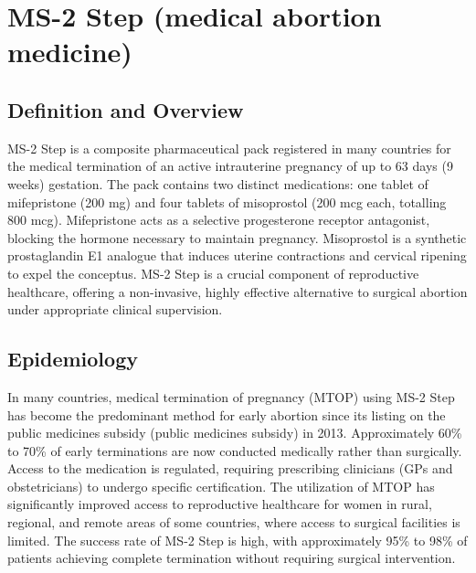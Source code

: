 \chapter{MS-2 Step (medical abortion medicine)}

\section*{Definition and Overview}
MS-2 Step is a composite pharmaceutical pack registered in many countries for the medical termination of an active intrauterine pregnancy of up to 63 days (9 weeks) gestation. The pack contains two distinct medications: one tablet of mifepristone (200 mg) and four tablets of misoprostol (200 mcg each, totalling 800 mcg). Mifepristone acts as a selective progesterone receptor antagonist, blocking the hormone necessary to maintain pregnancy. Misoprostol is a synthetic prostaglandin E1 analogue that induces uterine contractions and cervical ripening to expel the conceptus. MS-2 Step is a crucial component of reproductive healthcare, offering a non-invasive, highly effective alternative to surgical abortion under appropriate clinical supervision.

\section*{Epidemiology}
In many countries, medical termination of pregnancy (MTOP) using MS-2 Step has become the predominant method for early abortion since its listing on the public medicines subsidy (public medicines subsidy) in 2013. Approximately 60\% to 70\% of early terminations are now conducted medically rather than surgically. Access to the medication is regulated, requiring prescribing clinicians (GPs and obstetricians) to undergo specific certification. The utilization of MTOP has significantly improved access to reproductive healthcare for women in rural, regional, and remote areas of some countries, where access to surgical facilities is limited. The success rate of MS-2 Step is high, with approximately 95\% to 98\% of patients achieving complete termination without requiring surgical intervention.

